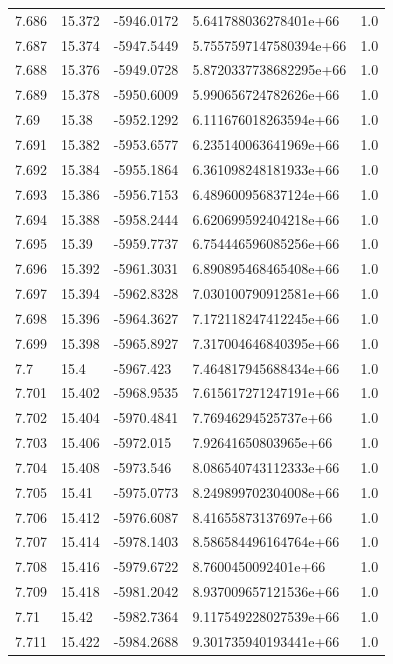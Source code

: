\begin{tabular}{lllll}
7.686 & 15.372 & -5946.0172 & 5.641788036278401e+66 & 1.0 \\
7.687 & 15.374 & -5947.5449 & 5.7557597147580394e+66 & 1.0 \\
7.688 & 15.376 & -5949.0728 & 5.8720337738682295e+66 & 1.0 \\
7.689 & 15.378 & -5950.6009 & 5.990656724782626e+66 & 1.0 \\
7.69 & 15.38 & -5952.1292 & 6.111676018263594e+66 & 1.0 \\
7.691 & 15.382 & -5953.6577 & 6.235140063641969e+66 & 1.0 \\
7.692 & 15.384 & -5955.1864 & 6.361098248181933e+66 & 1.0 \\
7.693 & 15.386 & -5956.7153 & 6.489600956837124e+66 & 1.0 \\
7.694 & 15.388 & -5958.2444 & 6.620699592404218e+66 & 1.0 \\
7.695 & 15.39 & -5959.7737 & 6.754446596085256e+66 & 1.0 \\
7.696 & 15.392 & -5961.3031 & 6.890895468465408e+66 & 1.0 \\
7.697 & 15.394 & -5962.8328 & 7.030100790912581e+66 & 1.0 \\
7.698 & 15.396 & -5964.3627 & 7.172118247412245e+66 & 1.0 \\
7.699 & 15.398 & -5965.8927 & 7.317004646840395e+66 & 1.0 \\
7.7 & 15.4 & -5967.423 & 7.464817945688434e+66 & 1.0 \\
7.701 & 15.402 & -5968.9535 & 7.615617271247191e+66 & 1.0 \\
7.702 & 15.404 & -5970.4841 & 7.76946294525737e+66 & 1.0 \\
7.703 & 15.406 & -5972.015 & 7.92641650803965e+66 & 1.0 \\
7.704 & 15.408 & -5973.546 & 8.086540743112333e+66 & 1.0 \\
7.705 & 15.41 & -5975.0773 & 8.249899702304008e+66 & 1.0 \\
7.706 & 15.412 & -5976.6087 & 8.41655873137697e+66 & 1.0 \\
7.707 & 15.414 & -5978.1403 & 8.586584496164764e+66 & 1.0 \\
7.708 & 15.416 & -5979.6722 & 8.7600450092401e+66 & 1.0 \\
7.709 & 15.418 & -5981.2042 & 8.937009657121536e+66 & 1.0 \\
7.71 & 15.42 & -5982.7364 & 9.117549228027539e+66 & 1.0 \\
7.711 & 15.422 & -5984.2688 & 9.301735940193441e+66 & 1.0 \\

\end{tabular}
